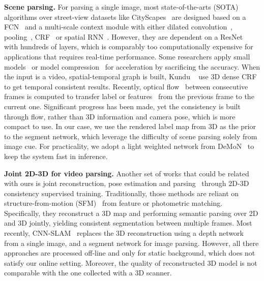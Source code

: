 \textbf{Scene parsing.} For parsing a single image, most state-of-the-arts (SOTA) algorithms over street-view datasets like CityScapes~\cite{Cordts2016Cityscapes} are designed based on a FCN~\cite{WuSH16e} and a multi-scale context module with either dilated convolution~\cite{ChenPSA17}, pooling~\cite{ZhaoSQWJ16}, CRF~\cite{higherordercrf_ECCV2016} or spatial RNN~\cite{byeon2015scene}. However, they are dependent on a ResNet~\cite{HeZRS15} with hundreds of layers, which is comparably too computationally expensive for applications that requires real-time performance. Some researchers apply small models~\cite{PaszkeCKC16} or model compression~\cite{ZhaoQSSJ17} for acceleration by sacrificing the accuracy.
When the input is a video, spatial-temporal graph is built, Kundu \etal~\cite{kundu2016feature} use 3D dense CRF to get temporal consistent results. Recently, optical flow~\cite{dosovitskiy2015flownet} between consecutive frames is computed to transfer label or features~\cite{gadde2017semantic,zhu2016deep} from the previous frame to the current one.  Significant progress has been made, yet the consistency is built through flow, rather than 3D information and camera pose, which is more compact to use. In our case, we use the rendered label map from 3D as the prior to the segment network, which leverage the difficulty of scene parsing solely from image cue. For practicality, we adopt a light weighted network from DeMoN~\cite{ummenhofer2016demon} to keep the system fast in inference.%


\textbf{Joint 2D-3D for video parsing.} Another set of works that could be related with ours is joint reconstruction, pose estimation and parsing~\cite{kundu2014joint,hane2013joint} through 2D-3D consistency supervised training.
 Traditionally, those methods are reliant on structure-from-motion (SFM)~\cite{hane2013joint} from feature or photometric matching. Specifically, they reconstruct a 3D map and performing semantic parsing over 2D and 3D jointly, yielding consistent segmentation between multiple frames.
 Most recently, CNN-SLAM~\cite{tateno2017cnn} replaces the 3D reconstruction using a depth network from a single image, and a segment network for image parsing.
 However, all there approaches are processed off-line and only for static background, which does not satisfy our online setting. Moreover, the quality of reconstructed 3D model is not comparable with the one collected with a 3D scanner. %
